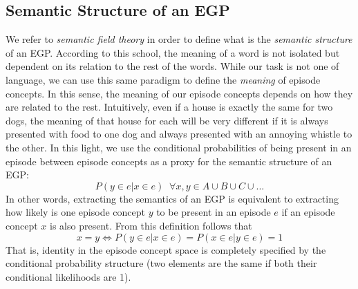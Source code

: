 \documentclass{article}
\begin{document}
\subsection*{Semantic Structure of an EGP}
We refer to  \textit{semantic field theory}  in order to define what is the \textit{semantic structure} of an EGP. According to this school, the meaning of a word is not isolated but dependent on its relation to the rest of the words. While our task is not one of language, we can use this same paradigm to define the \textit{meaning} of episode concepts. In this sense, the meaning of our episode concepts depends on how they are related to the rest. Intuitively, even if a house is exactly the same for two dogs, the meaning of that house for each will be very different if it is always presented with food to one dog and always presented with an annoying whistle to the other.
\newline\newline
In this light, we use the conditional probabilities of being present in an episode between episode concepts as a proxy for the semantic structure of an EGP:
\begin{equation}
    P(y \in e | x \in e) \;\; \forall x, y \in A\cup B\cup C\cup ...
\end{equation}
In other words, extracting the semantics of an EGP is equivalent to extracting how likely is one episode concept $y$ to be present in an episode $e$ if an episode concept $x$ is also present. From this definition follows that
\begin{equation}
    x = y \Longleftrightarrow P(y \in e | x \in e) = P(x \in e | y \in e) = 1
\end{equation}
That is, identity in the episode concept space is completely specified by the conditional probability structure (two elements are the same if both their conditional likelihoods are 1).
\end{document}
